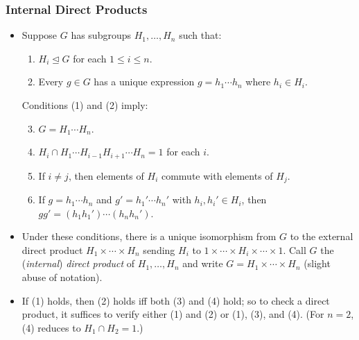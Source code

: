 \documentclass[../Odyssey_Project.tex]{subfiles}
\begin{document}
\subsubsection*{Internal Direct Products}
\begin{itemize}
    \item Suppose $G$ has subgroups $H_1, \dots, H_n$ such that:
    \begin{enumerate}
        \item $H_i \trianglelefteq G$ for each $1 \leq i \leq n$.
        \item Every $g \in G$ has a unique expression $g = h_1 \cdots h_n$ where $h_i \in H_i$.
    \end{enumerate}
    Conditions (1) and (2) imply:
    \begin{enumerate}
        \setcounter{enumi}{2}
        \item $G = H_1 \cdots H_n$.
        \item $H_i \cap H_1 \cdots H_{i-1} H_{i+1} \cdots H_n = 1$ for each $i$.
        \item If $i \neq j$, then elements of $H_i$ commute with elements of $H_j$.
        \item If $g = h_1 \cdots h_n$ and $g' = h_1' \cdots h_n'$ with $h_i, h_i' \in H_i$, then $gg' = (h_1 h_1') \cdots (h_n h_n')$.
    \end{enumerate}
    \item Under these conditions, there is a unique isomorphism from $G$ to the external direct product $H_1 \times \cdots \times H_n$ sending $H_i$ to $1 \times \cdots \times H_i \times \cdots \times 1$. Call $G$ the (\emph{internal}) \emph{direct product} of $H_1,\dots,H_n$ and write $G = H_1 \times \cdots \times H_n$ (slight abuse of notation).
    \item If (1) holds, then (2) holds iff both (3) and (4) hold; so to check a direct product, it suffices to verify either (1) and (2) or (1), (3), and (4). (For $n = 2$, (4) reduces to $H_1 \cap H_2 = 1$.)
\end{itemize}
\end{document}
